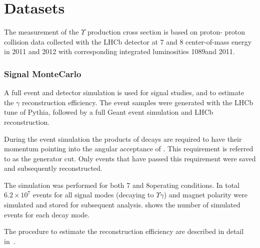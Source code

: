 \section{Datasets}
\label{sec:datasets}

The measurement of the $\Upsilon$ production cross section is based on proton-
proton collision data collected with the LHCb detector at 7 and 8\tev
center-of-mass energy in 2011 and 2012 with corresponding integrated luminosities
1089\invfb and 2011\invfb.

\subsubsection{Signal MonteCarlo}

A full event and detector simulation is used for signal studies, and to
estimate the $\gamma$ reconstruction efficiency. The event samples were
generated with the LHCb tune of Pythia\cite{LHCb-PROC-2010-056}, followed by a
full Geant\cite{Allison:2006ve} event simulation and LHCb reconstruction.

During the event simulation the products of \chib decays are required
to have their momentum pointing into the angular acceptance of \lhcb. This
requirement is referred to as the generator cut. Only events that have passed this
requirement were saved and subsequently reconstructed.

The simulation was performed for both 7 and 8\tev operating conditions. In
total $6.2\times10^7$ events for all signal modes (\chib decaying to $\Upsilon
\gamma$) and magnet polarity were simulated and stored for subsequent
analysis.  shows the number of simulated events for each decay
mode.




The procedure to estimate the
reconstruction efficiency are described in detail in~.

